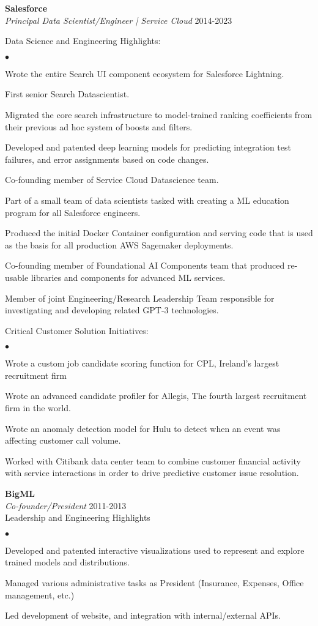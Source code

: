 \documentclass[margin,line]{res}
\newenvironment{list2}{
  \begin{list}{$\bullet$}{%
      \setlength{\itemsep}{0in}
      \setlength{\parsep}{0in} \setlength{\parskip}{0in}
      \setlength{\topsep}{0in} \setlength{\partopsep}{0in} 
      \setlength{\leftmargin}{0.2in}}}{\end{list}}
\begin{document}
\begin{resume}
{\bf Salesforce} \\
{\em Principal Data Scientist/Engineer | Service Cloud} \hfill 2014-2023

Data Science and Engineering Highlights:
\begin{list2}
  \item Wrote the entire Search UI component ecosystem for Salesforce Lightning.
  \item First senior Search Datascientist.
  \item Migrated the core search infrastructure to model-trained ranking coefficients from their previous ad hoc system of boosts and filters.
  \item Developed and patented deep learning models for predicting integration test failures, and error assignments based on code changes.
  \item Co-founding member of Service Cloud Datascience team.
  \item Part of a small team of data scientists tasked with creating a ML education program for all Salesforce engineers.
  \item Produced the initial Docker Container configuration and serving code that is used as the basis for all production AWS Sagemaker deployments.
  \item Co-founding member of Foundational AI Components team that produced re-usable libraries and components for advanced ML services.
  \item Member of joint Engineering/Research Leadership Team responsible for investigating and developing related GPT-3 technologies.
\end{list2}

Critical Customer Solution Initiatives:
  \begin{list2}
  \item Wrote a custom job candidate scoring function for CPL, Ireland’s largest recruitment firm
  \item Wrote an advanced candidate profiler for Allegis, The fourth largest recruitment firm in the world.
  \item Wrote an anomaly detection model for Hulu to detect when an event was affecting customer call volume.
  \item Worked with Citibank data center team to combine customer financial activity with service interactions in order to drive predictive customer issue resolution.
\end{list2}

{\bf BigML} \\
{\em Co-founder/President} \hfill 2011-2013\\
Leadership and Engineering Highlights
\begin{list2}
  \item Developed and patented interactive visualizations used to represent and explore trained models and distributions.
  \item Managed various administrative tasks as President (Insurance, Expenses, Office management, etc.)
  \item Led development of website, and integration with internal/external APIs.
\end{list2}



\end{resume}
\end{document}
